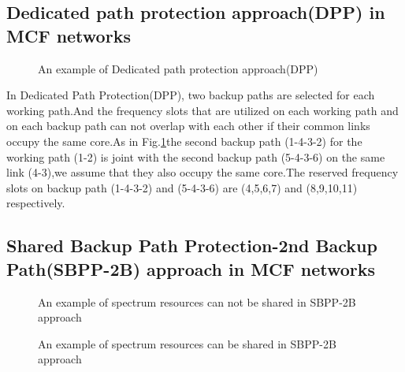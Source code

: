 \documentclass[a4paper,11pt]{report}
\begin{document}
    \subsection{Dedicated path protection approach(DPP) in MCF networks}
        \begin{figure}[htbp]
        \begin{center}
        \end{center}
        \caption{An example of Dedicated path protection approach(DPP)}
        \label{figure:DPP double}
        \end{figure}
    In Dedicated Path Protection(DPP), two backup paths are selected for each working path.And the frequency slots that are utilized on each working path and on each backup path can not overlap with each other if their common links occupy the same core.As in Fig.\ref{figure:DPP double}the second backup path (1-4-3-2) for the working path (1-2) is joint with the second backup path (5-4-3-6) on the same link (4-3),we assume that they also occupy the same core.The reserved frequency slots on backup path (1-4-3-2) and (5-4-3-6) are (4,5,6,7) and (8,9,10,11) respectively.
    
    
    
        
\subsection{Shared Backup Path Protection-2nd Backup Path(SBPP-2B) approach in MCF networks}  
    \begin{figure}[htbp]
        \begin{center}
        \end{center}
        \caption{An example of spectrum resources can not be shared in SBPP-2B approach}
        \label{figure:SBPP pair-wise joint}
        \end{figure}

    \begin{figure}[htbp]
        \begin{center}
        \end{center}
        \caption{An example of spectrum resources can be shared in SBPP-2B approach}
        \label{figure:SBPP pair-wise disjoint}
        \end{figure}
    
\end{document}
